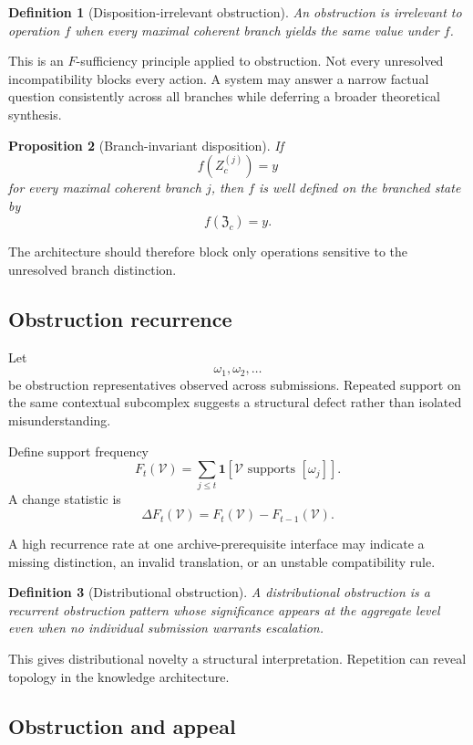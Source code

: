 \documentclass[11pt]{article}
\newtheorem{definition}{Definition}[section]
\newtheorem{proposition}[definition]{Proposition}
\theoremstyle{definition}
\newcommand{\ind}{\mathbf{1}}
\begin{document}
\begin{definition}[Disposition-irrelevant obstruction]
An obstruction is irrelevant to operation \(f\) when every maximal coherent branch yields the same value under \(f\).
\end{definition}

This is an \(F\)-sufficiency principle applied to obstruction. Not every unresolved incompatibility blocks every action. A system may answer a narrow factual question consistently across all branches while deferring a broader theoretical synthesis.

\begin{proposition}[Branch-invariant disposition]
If
\[
f(Z_c^{(j)})=y
\]
for every maximal coherent branch \(j\), then \(f\) is well defined on the branched state by
\[
f(\mathfrak Z_c)=y.
\]
\end{proposition}

The architecture should therefore block only operations sensitive to the unresolved branch distinction.

\subsection{Obstruction recurrence}

Let
\[
\omega_1,\omega_2,\ldots
\]
be obstruction representatives observed across submissions. Repeated support on the same contextual subcomplex suggests a structural defect rather than isolated misunderstanding.

Define support frequency
\[
F_t(\mathcal V)
=
\sum_{j\leq t}
\ind
\left[
\mathcal V
\text{ supports }
[\omega_j]
\right].
\]
A change statistic is
\[
\Delta F_t(\mathcal V)
=
F_t(\mathcal V)-F_{t-1}(\mathcal V).
\]

A high recurrence rate at one archive-prerequisite interface may indicate a missing distinction, an invalid translation, or an unstable compatibility rule.

\begin{definition}[Distributional obstruction]
A distributional obstruction is a recurrent obstruction pattern whose significance appears at the aggregate level even when no individual submission warrants escalation.
\end{definition}

This gives distributional novelty a structural interpretation. Repetition can reveal topology in the knowledge architecture.

\subsection{Obstruction and appeal}
\end{document}
